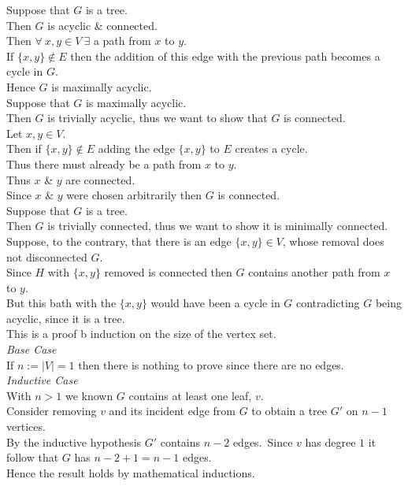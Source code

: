 \documentclass[11pt,a4paper]{article}
\begin{document}
Suppose that $G$ is a tree.\\
Then $G$ is acyclic \& connected.\\
Then $\forall\ x,y\in V\ \exists$ a path from $x$ to $y$.\\
If $\{x,y\}\not\in E$ then the addition of this edge with the previous path becomes a cycle in $G$.\\
Hence $G$ is maximally acyclic.\\

Suppose that $G$ is maximally acyclic.\\
Then $G$ is trivially acyclic, thus we want to show that $G$ is connected.\\
Let $x,y\in V$.\\
Then if $\{x,y\}\not\in E$ adding the edge $\{x,y\}$ to $E$ creates a cycle.\\
Thus there must already be a path from $x$ to $y$.\\
Thus $x$ \& $y$ are connected.\\
Since $x$ \& $y$ were chosen arbitrarily then $G$ is connected.\\

Suppose that $G$ is a tree.\\
Then $G$ is trivially connected, thus we want to show it is minimally connected.\\
Suppose, to the contrary, that there is an edge $\{x,y\}\in V$, whose removal does not disconnected $G$.\\
Since $H$ with $\{x,y\}$ removed is connected then $G$ contains another path from $x$ to $y$.\\
But this bath with the $\{x,y\}$ would have been a cycle in $G$ contradicting $G$ being acyclic, since it is a tree.\\

This is a proof b induction on the size of the vertex set.\\
\textit{Base Case}\\
If $n:=|V|=1$ then there is nothing to prove since there are no edges.\\
\textit{Inductive Case}\\
With $n>1$ we known $G$ contains at least one leaf, $v$.\\
Consider removing $v$ and its incident edge from $G$ to obtain a tree $G'$ on $n-1$ vertices.\\
By the inductive hypothesis $G'$ contains $n-2$ edges.\
Since $v$ has degree $1$ it follow that $G$ has $n-2+1=n-1$ edges.\\
Hence the result holds by mathematical inductions.\\
\end{document}
